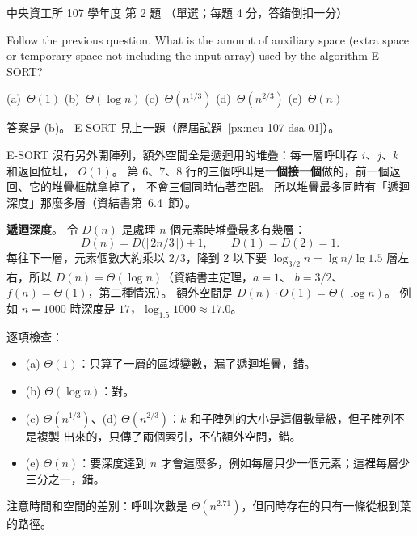 \begin{pastexam}[label={px:ncu-107-dsa-02}]{中央資工所 107 學年度 第 2 題}
（單選；每題 4 分，答錯倒扣一分）

Follow the previous question. What is the amount of auxiliary space (extra space or temporary
space not including the input array) used by the algorithm E-SORT?

(a)~$\Theta(1)$ \qquad (b)~$\Theta(\log n)$ \qquad (c)~$\Theta(n^{1/3})$ \qquad
(d)~$\Theta(n^{2/3})$ \qquad (e)~$\Theta(n)$
\end{pastexam}

\begin{pastsoln}
答案是 (b)。 E-SORT 見上一題（歷屆試題~\ref{px:ncu-107-dsa-01}）。

E-SORT 沒有另外開陣列，額外空間全是遞迴用的堆疊：每一層呼叫存 $i$、$j$、$k$ 和返回位址，
$O(1)$。 第 6、7、8 行的三個呼叫是\textbf{一個接一個}做的，前一個返回、它的堆疊框就拿掉了，
不會三個同時佔著空間。 所以堆疊最多同時有「遞迴深度」那麼多層（資結書第~6.4~節）。

\textbf{遞迴深度}。 令 $D(n)$ 是處理 $n$ 個元素時堆疊最多有幾層：
\[
D(n) = D\bigl(\lceil 2n/3 \rceil\bigr) + 1, \qquad D(1) = D(2) = 1 .
\]
每往下一層，元素個數大約乘以 $2/3$，降到 $2$ 以下要
$\log_{3/2} n = \lg n / \lg 1.5$ 層左右，所以 $D(n) = \Theta(\log n)$（資結書主定理，$a = 1$、
$b = 3/2$、$f(n) = \Theta(1)$，第二種情況）。 額外空間是 $D(n) \cdot O(1) = \Theta(\log n)$。
例如 $n = 1000$ 時深度是 $17$，$\log_{1.5} 1000 \approx 17.0$。

逐項檢查：
\begin{itemize}
\item (a) $\Theta(1)$：只算了一層的區域變數，漏了遞迴堆疊，錯。
\item (b) $\Theta(\log n)$：對。
\item (c) $\Theta(n^{1/3})$、(d) $\Theta(n^{2/3})$：$k$ 和子陣列的大小是這個數量級，但子陣列不是複製
出來的，只傳了兩個索引，不佔額外空間，錯。
\item (e) $\Theta(n)$：要深度達到 $n$ 才會這麼多，例如每層只少一個元素；這裡每層少三分之一，錯。
\end{itemize}
注意時間和空間的差別：呼叫次數是 $\Theta(n^{2.71})$，但同時存在的只有一條從根到葉的路徑。
\end{pastsoln}

